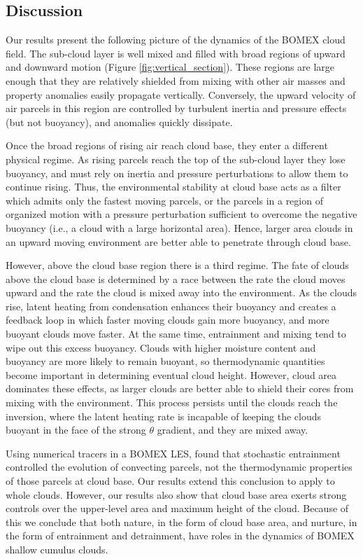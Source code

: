\documentclass[acp]{copernicus}
\begin{document}
\subsection{Discussion}

Our results present the following picture of the dynamics of the BOMEX cloud 
field.  The sub-cloud layer is well mixed and filled with broad regions of 
upward and downward motion (Figure \ref{fig:vertical_section}).  These regions 
are large enough that they are relatively shielded from mixing with other air 
masses and property anomalies easily propagate vertically.  Conversely, the 
upward velocity of air parcels in this region are controlled by turbulent 
inertia and pressure effects (but not buoyancy), and anomalies quickly 
dissipate.

Once the broad regions of rising air reach cloud base, they enter a different 
physical regime.  As rising parcels reach the top of the sub-cloud layer they 
lose buoyancy, and must rely on inertia and pressure perturbations to 
allow them to continue rising.  Thus, the environmental stability at cloud base 
acts as a filter which admits only the fastest moving parcels, or the parcels 
in a region of organized motion with a pressure perturbation sufficient to 
overcome the negative buoyancy (i.e., a cloud with a large horizontal area).  
Hence, larger area clouds in an upward moving environment are better able to
penetrate through cloud base.

However, above the cloud base region there is a third regime.  The fate of 
clouds above the cloud base is determined by a race between the rate the cloud 
moves upward and the rate the cloud is mixed away into the environment.  As the 
clouds rise, latent heating from condensation enhances their buoyancy and 
creates a feedback loop in which faster moving clouds gain more buoyancy, and 
more buoyant clouds move faster.  At the same time, entrainment and mixing 
tend to wipe out this excess buoyancy.  Clouds with higher moisture content and 
buoyancy are more likely to remain buoyant, so thermodynamic quantities become 
important in determining eventual cloud height.  However, cloud area dominates 
these effects, as larger clouds are better able to shield their cores from 
mixing with the environment.  This process persists until the clouds reach the 
inversion, where the latent heating rate is incapable of keeping the clouds 
buoyant in the face of the strong $\theta$ gradient, and they are mixed 
away.

Using numerical tracers in a BOMEX LES, \cite{Romps2010a} found that 
stochastic entrainment controlled the evolution of convecting parcels, not 
the thermodynamic properties of those parcels at cloud base.  Our results 
extend this conclusion to apply to whole clouds.  However, our results also 
show that cloud base area exerts strong controls over the upper-level area and 
maximum height of the cloud.  Because of this we conclude that both nature, in 
the form of cloud base area, and nurture, in the form of entrainment and 
detrainment, have roles in the dynamics of BOMEX shallow cumulus clouds.  
\end{document}
